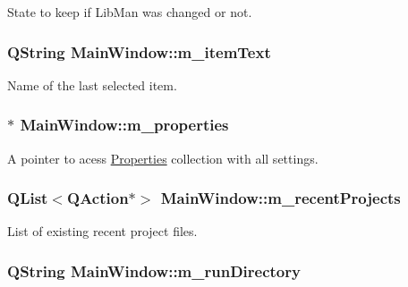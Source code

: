 State to keep if Lib\-Man was changed or not. \hypertarget{classMainWindow_a494664d1901f3d94237411b34e7a2a16}{
\subsubsection[{m\-\_\-item\-Text}]{\setlength{\rightskip}{0pt plus 5cm}Q\-String Main\-Window\-::m\-\_\-item\-Text\hspace{0.3cm}{\ttfamily [private]}}}\label{classMainWindow_a494664d1901f3d94237411b34e7a2a16}
Name of the last selected item. \hypertarget{classMainWindow_a22f004bec556234a5eb739cfa1819647}{
\subsubsection[{m\-\_\-properties}]{$\ast$ Main\-Window\-::m\-\_\-properties\hspace{0.3cm}{\ttfamily [private]}}}\label{classMainWindow_a22f004bec556234a5eb739cfa1819647}
A pointer to acess \hyperlink{classProperties}{Properties} collection with all settings. \hypertarget{classMainWindow_a4135ecd5a58b2679333740dddc8d2cf8}{
\subsubsection[{m\-\_\-recent\-Projects}]{\setlength{\rightskip}{0pt plus 5cm}Q\-List$<$Q\-Action$\ast$$>$ Main\-Window\-::m\-\_\-recent\-Projects\hspace{0.3cm}{\ttfamily [private]}}}\label{classMainWindow_a4135ecd5a58b2679333740dddc8d2cf8}
List of existing recent project files. \hypertarget{classMainWindow_a9294c8737725afe7b0b7dcc311881959}{
\subsubsection[{m\-\_\-run\-Directory}]{\setlength{\rightskip}{0pt plus 5cm}Q\-String Main\-Window\-::m\-\_\-run\-Directory\hspace{0.3cm}{\ttfamily [private]}}}\label{classMainWindow_a9294c8737725afe7b0b7dcc311881959}
